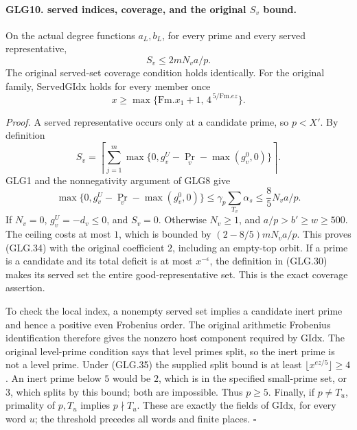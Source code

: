 \paragraph{GLG10. served indices, coverage, and the original \(S_v\) bound.}
\label{claim:GLG10}
On the actual degree functions \(a_L,b_L\), for every prime
and every served representative,
\[
                         S_v\le 2mN_va/p .                        \tag{GLG.34}
\]
The original served-set coverage condition holds identically.
For the original family, \(\mathrm{ServedGIdx}\) holds for every
member once
\[
              x\ge\max\{\mathrm{Fm}.x_1+1,\,
                                      4^{\,5/\mathrm{Fm}.ez}\}.   \tag{GLG.35}
\]

\emph{Proof.}
A served representative occurs only at a candidate prime, so
\(p<X'\). By definition
\[
 S_v=\left\lceil\sum_{j=1}^m
       \max\{0,g_v^U-\Pr_v-\max(g_v^0,0)\}\right\rceil .
 \]
GLG1 and the nonnegativity argument of GLG8 give
\[
 \max\{0,g_v^U-\Pr_v-\max(g_v^0,0)\}
       \le\gamma_p\sum_{T_v}\alpha_s\le\frac85N_va/p.
 \]
If \(N_v=0\), \(g_v^U=-d_v\le0\), and \(S_v=0\).
Otherwise \(N_v\ge1\), and \(a/p>b'\ge w\ge500\).
The ceiling costs at most \(1\), which is bounded by
\((2-8/5)mN_va/p\). This proves (GLG.34) with the
original coefficient \(2\), including an empty-top orbit.
If a prime is a candidate and its total deficit is at most
\(x^{-\epsilon}\), the definition in (GLG.30) makes its
served set the entire good-representative set. This is the
exact coverage assertion.

To check the local index, a nonempty served set implies a
candidate inert prime and hence a positive even Frobenius
order. The original arithmetic Frobenius identification
therefore gives the nonzero host component required by
\(\mathrm{GIdx}\). The original level-prime condition says
that level primes split, so the inert prime is not a level
prime. Under (GLG.35) the supplied split bound is at least
\(\lfloor x^{ez/5}\rfloor\ge4\). An inert prime below \(5\)
would be \(2\), which is in the specified small-prime set,
or \(3\), which splits by this bound; both are impossible.
Thus \(p\ge5\). Finally, if \(p\ne T_u\), primality of
\(p,T_u\) implies \(p\nmid T_u\). These are exactly the
fields of \(\mathrm{GIdx}\), for every word \(u\); the
threshold precedes all words and finite places.
\hfill\(\square\)

